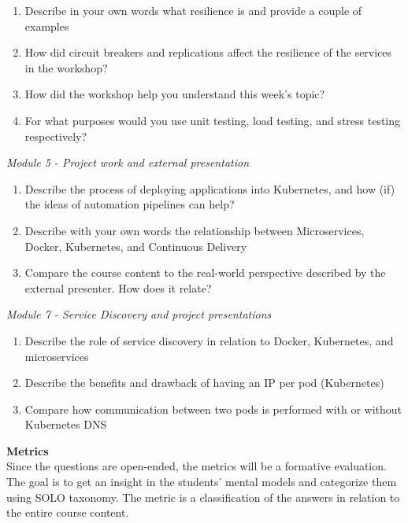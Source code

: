 \vspace{-5mm}
\begin{enumerate}
\setlength\itemsep{0.05em}
    \item Describe in your own words what resilience is and provide a couple of examples
    \item How did circuit breakers and replications affect the resilience of the services in the workshop?
    \item How did the workshop help you understand this week's topic?
    \item For what purposes would you use unit testing, load testing, and stress testing respectively?
\end{enumerate}

\noindent\textit{Module 5 - Project work and external presentation}\\

\vspace{-5mm}
\begin{enumerate}
\setlength\itemsep{0.05em}
    \item Describe the process of deploying applications into Kubernetes, and how (if) the ideas of automation pipelines can help?
    \item Describe with your own words the relationship between Microservices, Docker, Kubernetes, and Continuous Delivery
    \item Compare the course content to the real-world perspective described by the external presenter. How does it relate?
\end{enumerate}

\noindent\textit{Module 7 - Service Discovery and project presentations}\\

\vspace{-5mm}
\begin{enumerate}
\setlength\itemsep{0.05em}
    \item Describe the role of service discovery in relation to Docker, Kubernetes, and microservices
    \item Describe the benefits and drawback of having an IP per pod (Kubernetes)
    \item Compare how communication between two pods is performed with or without Kubernetes DNS
\end{enumerate}

\noindent\textbf{Metrics} \\
Since the questions are open-ended, the metrics will be a formative evaluation. The goal is to get an insight in the students' mental models and categorize them using  SOLO taxonomy. The metric is a classification of the answers in relation to the entire course content. \\

